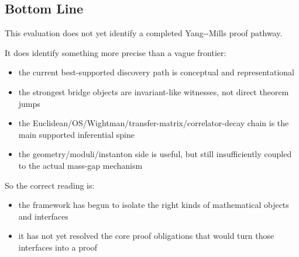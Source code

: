 \documentclass[
]{article}
\providecommand{\tightlist}{%
  \setlength{\itemsep}{0pt}\setlength{\parskip}{0pt}}
\begin{document}
\subsection{Bottom Line}\label{bottom-line}

This evaluation does not yet identify a completed Yang-\/-Mills proof
pathway.

It does identify something more precise than a vague frontier:

\begin{itemize}
\tightlist
\item
  the current best-supported discovery path is conceptual and
  representational
\item
  the strongest bridge objects are invariant-like witnesses, not direct
  theorem jumps
\item
  the Euclidean/OS/Wightman/transfer-matrix/correlator-decay chain is
  the main supported inferential spine
\item
  the geometry/moduli/instanton side is useful, but still insufficiently
  coupled to the actual mass-gap mechanism
\end{itemize}

So the correct reading is:

\begin{itemize}
\tightlist
\item
  the framework has begun to isolate the right kinds of mathematical
  objects and interfaces
\item
  it has not yet resolved the core proof obligations that would turn
  those interfaces into a proof
\end{itemize}
\end{document}
